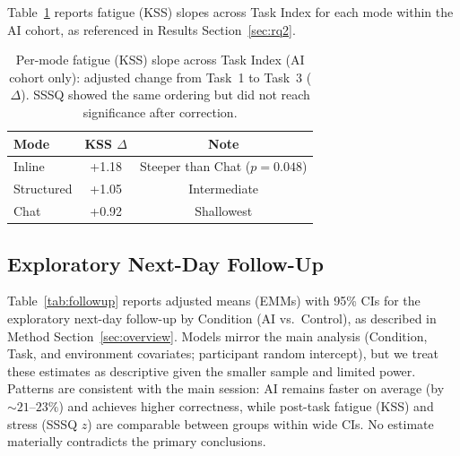 \documentclass[sigconf]{acmart}
\begin{document}
Table~\ref{tab:per-mode-slopes} reports fatigue (KSS) slopes across Task Index for each mode within the AI cohort, as referenced in Results Section~\ref{sec:rq2}.

\begin{table}[h!]
  \centering
  \caption{Per-mode fatigue (KSS) slope across Task Index (AI cohort only): adjusted change from Task~1 to Task~3 ($\Delta$). SSSQ showed the same ordering but did not reach significance after correction.}
  \label{tab:per-mode-slopes}
  \small
  \begin{tabular}{lcc}
    \toprule
    \textbf{Mode} & \textbf{KSS $\Delta$} & \textbf{Note} \\
    \midrule
    Inline     & +1.18 & Steeper than Chat ($p{=}0.048$) \\
    Structured & +1.05 & Intermediate \\
    Chat       & +0.92 & Shallowest \\
    \bottomrule
  \end{tabular}
\end{table}

\subsection{Exploratory Next-Day Follow-Up}

Table~\ref{tab:followup} reports adjusted means (EMMs) with 95\% CIs for the exploratory next-day follow-up by Condition (AI vs.\ Control), as described in Method Section~\ref{sec:overview}. Models mirror the main analysis (Condition, Task, and environment covariates; participant random intercept), but we treat these estimates as descriptive given the smaller sample and limited power. Patterns are consistent with the main session: AI remains faster on average (by ${\sim}21$--$23\%$) and achieves higher correctness, while post-task fatigue (KSS) and stress (SSSQ $z$) are comparable between groups within wide CIs. No estimate materially contradicts the primary conclusions.
\end{document}
